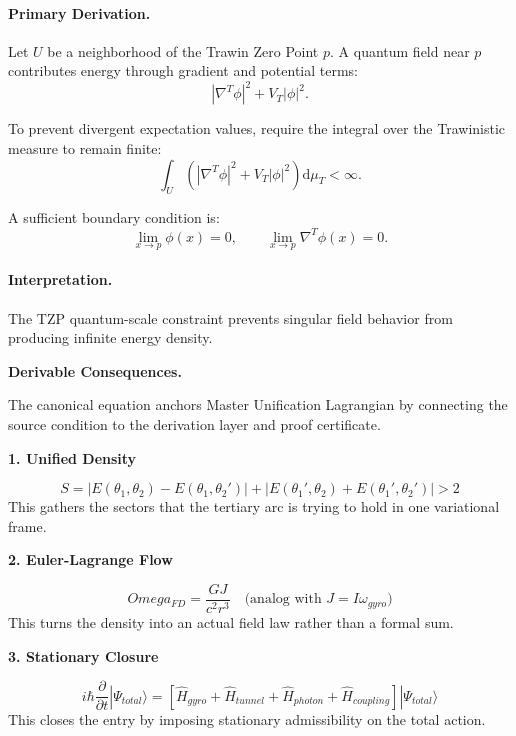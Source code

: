 \paragraph{Primary Derivation.}
Let $U$ be a neighborhood of the Trawin Zero Point $p$.  
A quantum field near $p$ contributes energy through gradient and potential terms:
\begin{equation}
|\nabla^T\phi|^2
+
V_T|\phi|^2 .
\end{equation}

To prevent divergent expectation values, require the integral over the Trawinistic measure to remain finite:
\begin{equation}
\int_U
\left(
|\nabla^T\phi|^2
+
V_T|\phi|^2
\right)
\mathrm{d}\mu_T
<\infty .
\end{equation}

A sufficient boundary condition is:
\begin{equation}
\boxed{
\lim_{x\to p}\phi(x)=0,
\qquad
\lim_{x\to p}\nabla^T\phi(x)=0 .
}
\end{equation}

\paragraph{Interpretation.}
The TZP quantum-scale constraint prevents singular field behavior from producing infinite energy density.

\par\vspace{0.35em}
\noindent\textbf{Derivable Consequences.}\quad
\begingroup
\footnotesize
\raggedright
The canonical equation anchors Master Unification Lagrangian by connecting the source condition to the derivation layer and proof certificate.
\par\endgroup

\noindent\textbf{1. Unified Density}\par
\[
S = |E(\theta_1, \theta_2) - E(\theta_1, \theta_2')| + |E(\theta_1', \theta_2) + E(\theta_1', \theta_2')| > 2
\]
\noindent This gathers the sectors that the tertiary arc is trying to hold in one variational frame.\par
\noindent\textbf{2. Euler-Lagrange Flow}\par
\[
Omega_{FD} = \frac{GJ}{c^2 r^3} \quad \text{(analog with } J = I\omega_{gyro}\text{)}
\]
\noindent This turns the density into an actual field law rather than a formal sum.\par
\noindent\textbf{3. Stationary Closure}\par
\[
i\hbar\frac{\partial}{\partial t}|\Psi_{total}\rangle = \left[\hat{H}_{gyro} + \hat{H}_{tunnel} + \hat{H}_{photon} + \hat{H}_{coupling}\right]|\Psi_{total}\rangle
\]
\noindent This closes the entry by imposing stationary admissibility on the total action.\par

